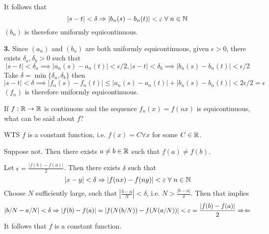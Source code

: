 \documentclass[a4paper, 12pt]{article}
\begin{document}
\begin{solution}
    It follows that \[
    |s - t| < \delta \implies |b_n(s) - b_n(t)| < \epsilon \forall n \in \bbn
    \]
    $(b_n)$ is therefore uniformly equicontinuous.

    \textbf{3.} Since $(a_n)$ and $(b_n)$ are both uniformly equicontinuous, given $\epsilon > 0$, there exists $\delta_a, \delta_b > 0$ such that \[
    |s-t| < \delta_a \implies |a_n(s) - a_n(t)| < \epsilon /2, |s-t| < \delta_b \implies |b_n(s) - b_n(t)| < \epsilon/2
    \]
    Take $\delta = \min\{\delta_a, \delta_b\}$ then \[
    |s-t| < \delta \implies |f_n(s) - f_n(t)| \leq |a_n(s) - a_n(t)| + |b_n(s) - b_n(t)| < 2\epsilon / 2 = \epsilon 
    \]
    $(f_n)$ is therefore uniformly equicontinuous.
\end{solution}
\begin{problem} 
If $f: \mathbb{R} \to \mathbb{R}$ is continuous and the sequence $f_n(x) = f(nx)$ is equicontinuous, what can be said about $f$?
\end{problem}
\begin{solution}
    WTS $f$ is a constant function, i.e. $f(x) = C \forall x$ for some $C \in \mathbb{R}$.

    Suppose not. Then there exists $a \neq b \in \mathbb{R}$ such that $f(a) \neq f(b)$.

    Let $\epsilon = \frac{|f(b) - f(a)|}{2}$. Then there exists $\delta$ such that \[
        |x-y| < \delta \implies |f(nx) - f(ny)| < \epsilon \forall n \in \bbn
    \]
    Choose $N$ sufficiently large, such that $|\frac{b-a}{N}| < \delta$, i.e. $N > \frac{|b-a|}{\delta}$. Then that implies \[
        |b/N - a/N| < \delta \Rightarrow |f(b) - f(a)| = |f(N(b/N)) - f(N(a/N))| < \varepsilon = \frac{|f(b) - f(a)|}{2} \Rightarrow\Leftarrow
    \]
    It follows that $f$ is a constant function.
\end{solution}
\end{document}
